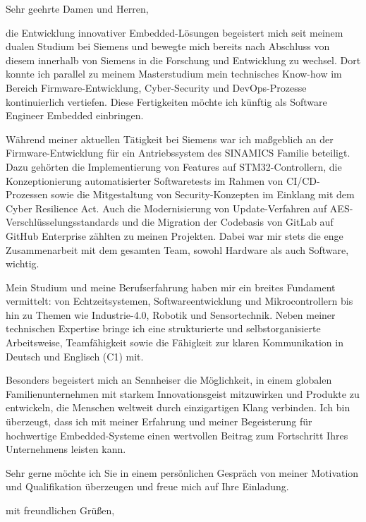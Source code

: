 \documentclass[11pt,a4paper,sans]{moderncv}        %
\def\justifying{%
  \rightskip=0pt
  \spaceskip=0pt
  \xspaceskip=0pt
  \relax
}
\begin{document}
\subject{\color{awesome-emerald}{Bewerbung als Software Engineer Embedded (Stellenangebotsnummer: 2500003M)}}
\opening{Sehr geehrte Damen und Herren,}
\makelettertitle
\justifying

die Entwicklung innovativer Embedded-Lösungen begeistert mich seit meinem dualen Studium bei Siemens
und bewegte mich bereits nach Abschluss von diesem innerhalb von Siemens in die Forschung und
Entwicklung zu wechsel. Dort konnte ich parallel zu meinem Masterstudium mein technisches Know-how
im Bereich Firmware-Entwicklung, Cyber-Security und DevOps-Prozesse kontinuierlich vertiefen. Diese
Fertigkeiten möchte ich künftig als Software Engineer Embedded einbringen.

Während meiner aktuellen Tätigkeit bei Siemens war ich maßgeblich an der Firmware-Entwicklung für
ein Antriebssystem des SINAMICS Familie beteiligt. Dazu gehörten die Implementierung von Features
auf STM32-Controllern, die Konzeptionierung automatisierter Softwaretests im Rahmen von
CI/CD-Prozessen sowie die Mitgestaltung von Security-Konzepten im Einklang mit dem Cyber Resilience
Act. Auch die Modernisierung von Update-Verfahren auf AES-Verschlüsselungsstandards und die
Migration der Codebasis von GitLab auf GitHub Enterprise zählten zu meinen Projekten. Dabei war mir
stets die enge Zusammenarbeit mit dem gesamten Team, sowohl Hardware als auch Software, wichtig.

Mein Studium und meine Berufserfahrung haben mir ein breites Fundament vermittelt: von
Echtzeitsystemen, Softwareentwicklung und Mikrocontrollern bis hin zu Themen wie
Industrie-4.0, Robotik und Sensortechnik. Neben meiner technischen Expertise bringe ich eine
strukturierte und selbstorganisierte Arbeitsweise, Teamfähigkeit sowie die Fähigkeit zur klaren
Kommunikation in Deutsch und Englisch (C1) mit.

Besonders begeistert mich an Sennheiser die Möglichkeit, in einem globalen Familienunternehmen mit
starkem Innovationsgeist mitzuwirken und Produkte zu entwickeln, die Menschen weltweit durch
einzigartigen Klang verbinden. Ich bin überzeugt, dass ich mit meiner Erfahrung und meiner
Begeisterung für hochwertige Embedded-Systeme einen wertvollen Beitrag zum Fortschritt Ihres
Unternehmens leisten kann.

Sehr gerne möchte ich Sie in einem persönlichen Gespräch von meiner Motivation und Qualifikation
überzeugen und freue mich auf Ihre Einladung.

\vspace{2\baselineskip}
\enlargethispage{2\baselineskip}
\closing{mit freundlichen Grüßen,}
\makeletterclosing
\end{document}

